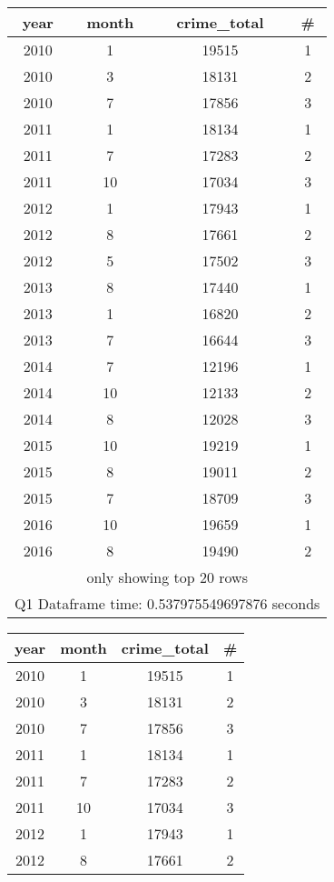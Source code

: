 \documentclass{article}
\begin{document}
\begin{center} 
\noindent %
\begin{tabular}[t]{|c|c|c|c|}
\hline
\textbf{year} & \textbf{month} & \textbf{crime\_total} & \textbf{\#} \\
\hline
2010 & 1 & 19515 & 1 \\
2010 & 3 & 18131 & 2 \\
2010 & 7 & 17856 & 3 \\
2011 & 1 & 18134 & 1 \\
2011 & 7 & 17283 & 2 \\
2011 & 10 & 17034 & 3 \\
2012 & 1 & 17943 & 1 \\
2012 & 8 & 17661 & 2 \\
2012 & 5 & 17502 & 3 \\
2013 & 8 & 17440 & 1 \\
2013 & 1 & 16820 & 2 \\
2013 & 7 & 16644 & 3 \\
2014 & 7 & 12196 & 1 \\
2014 & 10 & 12133 & 2 \\
2014 & 8 & 12028 & 3 \\
2015 & 10 & 19219 & 1 \\
2015 & 8 & 19011 & 2 \\
2015 & 7 & 18709 & 3 \\
2016 & 10 & 19659 & 1 \\
2016 & 8 & 19490 & 2 \\
\hline
\multicolumn{4}{|c|}{only showing top 20 rows} \\
\hline
\multicolumn{4}{|c|}{Q1 Dataframe time: 0.537975549697876 seconds} \\
\hline
\end{tabular}
\hspace{10mm} %
\begin{tabular}[t]{|c|c|c|c|}
\hline
\textbf{year} & \textbf{month} & \textbf{crime\_total} & \textbf{\#} \\
\hline
2010 & 1 & 19515 & 1 \\
2010 & 3 & 18131 & 2 \\
2010 & 7 & 17856 & 3 \\
2011 & 1 & 18134 & 1 \\
2011 & 7 & 17283 & 2 \\
2011 & 10 & 17034 & 3 \\
2012 & 1 & 17943 & 1 \\
2012 & 8 & 17661 & 2 \\

\end{tabular}
\end{center}
\end{document}
